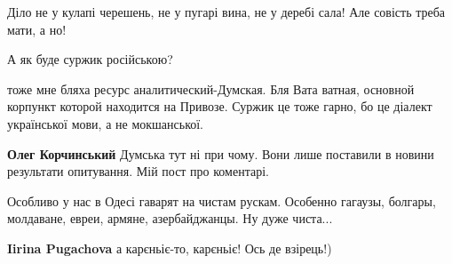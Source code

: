 \begin{itemize}
{Діло не у кулапі черешень, не у пугарі вина, не у деребі сала! Але совість
треба мати, а но!


 

А як буде суржик російською?

 

тоже мне бляха ресурс аналитический-Думская. Бля Вата ватная, основной корпункт
которой находится на Привозе. Суржик це тоже гарно, бо це діалект української
мови, а не мокшанської.

\begin{itemize}{
 
\textbf{Олег Корчинський} Думська тут ні при чому. Вони лише поставили в новини результати опитування. Мій пост про коментарі.
}\end{itemize}

 

Особливо у нас в Одесі гаварят на чистам рускам. Особенно гагаузы, болгары, молдаване, евреи, армяне, азербайджанцы.
Ну дуже чиста...

\begin{itemize}{
 
\textbf{Iirina Pugachova} а карєньіє-то, карєньіє! Ось де взірець!)

 
}
\end{itemize}}
\end{itemize}

